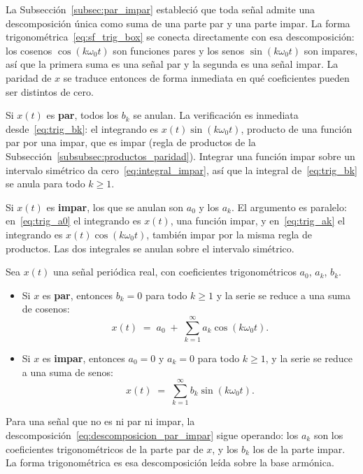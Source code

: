 \documentclass[class=book, crop=false]{standalone}
\begin{document}
La Subsección~\ref{subsec:par_impar} estableció que toda señal
admite una descomposición única como suma de una parte par y una
parte impar. La forma trigonométrica~\eqref{eq:sf_trig_box} se conecta
directamente con esa descomposición: los cosenos $\cos(k\omega_0 t)$
son funciones pares y los senos $\sin(k\omega_0 t)$ son impares, así
que la primera suma es una señal par y la segunda es una señal
impar. La paridad de $x$ se traduce entonces de forma inmediata en
qué coeficientes pueden ser distintos de cero.

Si $x(t)$ es \textbf{par}, todos los $b_k$ se anulan. La verificación
es inmediata desde~\eqref{eq:trig_bk}: el integrando es
$x(t)\sin(k\omega_0 t)$, producto de una función par por una impar,
que es impar (regla de productos de la
Subsección~\ref{subsubsec:productos_paridad}).
Integrar una función impar sobre un intervalo simétrico da
cero~\eqref{eq:integral_impar}, así que la integral
de~\eqref{eq:trig_bk} se anula para todo $k\geq 1$.

Si $x(t)$ es \textbf{impar}, los que se anulan son $a_0$ y los
$a_k$. El argumento es paralelo: en~\eqref{eq:trig_a0} el integrando
es $x(t)$, una función impar, y en~\eqref{eq:trig_ak} el integrando
es $x(t)\cos(k\omega_0 t)$, también impar por la misma regla de
productos. Las dos integrales se anulan sobre el intervalo simétrico.

\begin{resultado}
Sea $x(t)$ una señal periódica real, con coeficientes
trigonométricos $a_0$, $a_k$, $b_k$.
\begin{itemize}
    \item Si $x$ es \textbf{par}, entonces $b_k = 0$ para todo
          $k \geq 1$ y la serie se reduce a una suma de cosenos:
          \[
              x(t) \;=\; a_0 \;+\; \sum_{k=1}^{\infty}
                  a_k\cos(k\omega_0 t).
          \]
    \item Si $x$ es \textbf{impar}, entonces $a_0 = 0$ y $a_k = 0$
          para todo $k \geq 1$, y la serie se reduce a una suma de
          senos:
          \[
              x(t) \;=\; \sum_{k=1}^{\infty}
                  b_k\sin(k\omega_0 t).
          \]
\end{itemize}
\end{resultado}

Para una señal que no es ni par ni impar, la
descomposición~\eqref{eq:descomposicion_par_impar} sigue operando: los
$a_k$ son los coeficientes trigonométricos de la parte par de $x$, y
los $b_k$ los de la parte impar. La forma trigonométrica es esa
descomposición leída sobre la base armónica.
\end{document}
